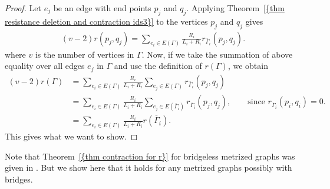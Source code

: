 \documentclass[12pt]{amsart}
\theoremstyle{example}
\theoremstyle{definition}
\theoremstyle{notation}
\begin{document}
\begin{proof}
Let $e_j$ be an edge with end points $p_j$ and $q_j$. Applying {Theorem~\ref{{thm resistance deletion and contraction ids3}}} to the vertices
$p_j$ and $q_j$ gives
\begin{equation*}\label{eqn contraction generalej}
\begin{split}
(v-2) r(p_j,q_j)= \sum_{e_i \in {E({\Gamma})}} \frac{R_{i}}{{L_{i}}+{R_{i}}} r_{{{\overline{\Gamma}}}_i}(p_j,q_j).
\end{split}
\end{equation*}
where $v$ is the number of vertices in ${\Gamma}$.
Now, if we take the summation of above equality over all edges $e_j$ in ${\Gamma}$ and use the definition of $r({\Gamma})$, we obtain
\begin{equation*}\label{eqn contraction generalej2}
\begin{split}
(v-2) r({\Gamma}) &= \sum_{e_i \in {E({\Gamma})}} \frac{R_{i}}{{L_{i}}+{R_{i}}} \sum_{e_j \in {E({\Gamma})}} r_{{{\overline{\Gamma}}}_i}(p_j,q_j)\\
             &= \sum_{e_i \in {E({\Gamma})}} \frac{R_{i}}{{L_{i}}+{R_{i}}} \sum_{e_j \in {E({{{\overline{\Gamma}}}_i})}} r_{{{\overline{\Gamma}}}_i}(p_j,q_j), \qquad \text{since $r_{{{\overline{\Gamma}}}_i}(p_i,q_i)=0$}.\\
             &= \sum_{e_i \in {E({\Gamma})}} \frac{R_{i}}{{L_{i}}+{R_{i}}} r({{\overline{\Gamma}}}_i).
\end{split}
\end{equation*}
This gives what we want to show.
\end{proof}
Note that {Theorem~\ref{{thm contraction for r}}} for bridgeless metrized graphs was given in \cite[Corollary 4.13]{C5}. But we show here that it holds for any metrized graphs possibly with bridges.
\end{document}
